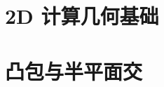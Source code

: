 \section{2D 计算几何基础}
\label{basic2d:sec:basic}


\questions


\section{凸包与半平面交}
\label{cvh:sec:cvhhpis}


\questions
